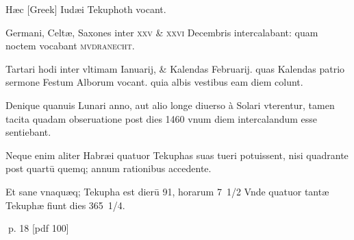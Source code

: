 \begin{parnumbers}
Hæc \textgreek{[Greek]} Iudæi Tekuphoth vocant.

Germani, Celtæ, Saxones inter \textsc{xxv \& xxvi} Decembris intercalabant: quam noctem vocabant \textsc{mvdranecht}.

Tartari hodi inter vltimam Ianuarij, \& Kalendas Februarij. quas Kalendas patrio sermone Festum Alborum vocant. quia albis vestibus eam diem colunt.

Denique quanuis  Lunari anno, aut alio longe diuerso à Solari vterentur, tamen tacita quadam obseruatione post dies 1460 vnum diem intercalandum esse sentiebant.

Neque enim aliter Habræi quatuor Tekuphas suas tueri potuissent, nisi quadrante post quartū quemq; annum rationibus accedente.

Et sane vnaquæq; Tekupha est dierū 91, horarum 7 1/2 Vnde quatuor tantæ Tekuphæ fiunt dies 365 1/4.

\end{parnumbers}
\clearpage
p. 18 [pdf 100]

